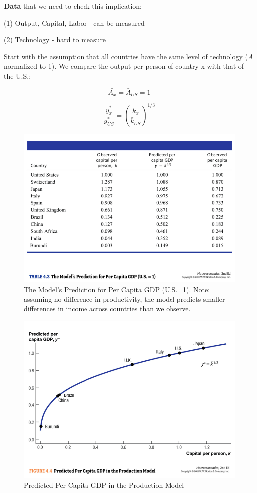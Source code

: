 \documentclass[12pt]{article}
\begin{document}
{\bf Data} that we need to check this implication: 

(1) Output, Capital, Labor - can be measured 

(2) Technology - hard to measure 

Start with the assumption that all countries have the same level of technology ($A$ normalized to 1). We compare the output per person of country x with that of the U.S.:

\begin{equation*}
 \bar{A_{x}}={\bar{A}_{US}}=1
\end{equation*}

\begin{equation*}
\frac{y_{x}^*}{y_{US}^*}=\left(\frac{\bar{k_{x}}}{\bar{k}_{US}}\right)^{1/3}
\end{equation*}

\begin{figure}[H]
\caption{The Model's Prediction for Per Capita GDP (U.S.=1). Note: assuming no difference in productivity, the model predicts smaller differences in income across countries than we observe.}
\centering
\includegraphics[width=120mm, scale=0.5]{Table_4-3.jpg}
\end{figure}

\begin{figure}[H]
\caption{Predicted Per Capita GDP in the Production Model}
\centering
\includegraphics[width=120mm, scale=0.5]{Figure_4-4.png}
\end{figure}
\end{document}
